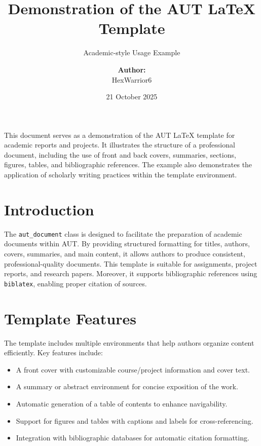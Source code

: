 \documentclass{aut_document}
\title{Demonstration of the AUT LaTeX Template}
\subtitle{Academic-style Usage Example}
\author{%
    \textbf{Author:}\\
    HexWarrior6
}
\date{21 October 2025}
\begin{document}
\makefrontcover

\begin{summary}
This document serves as a demonstration of the AUT LaTeX template for academic 
reports and projects. It illustrates the structure of a professional document, 
including the use of front and back covers, summaries, sections, figures, tables, 
and bibliographic references. The example also demonstrates the application of 
scholarly writing practices within the template environment.
\end{summary}

\tableofcontents

\startmaincontent

\section{Introduction}

The \texttt{aut\_document} class is designed to facilitate the preparation of 
academic documents within AUT. By providing structured formatting for titles, 
authors, covers, summaries, and main content, it allows authors to produce 
consistent, professional-quality documents. This template is suitable for 
assignments, project reports, and research papers. Moreover, it supports 
bibliographic references using \texttt{biblatex}, enabling proper citation of 
sources.

\section{Template Features}

The template includes multiple environments that help authors organize content 
efficiently. Key features include:

\begin{itemize}
    \item A front cover with customizable course/project information and cover text.
    \item A summary or abstract environment for concise exposition of the work.
    \item Automatic generation of a table of contents to enhance navigability.
    \item Support for figures and tables with captions and labels for cross-referencing.
    \item Integration with bibliographic databases for automatic citation formatting.
\end{itemize}
\end{document}
